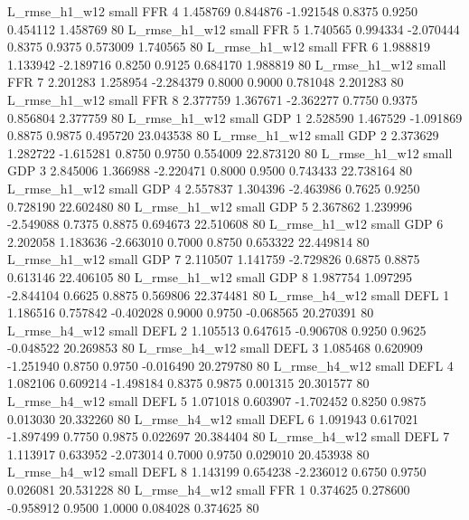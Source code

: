 L_rmse_h1_w12      small      FFR                 4 1.458769 0.844876 -1.921548 0.8375 0.9250  0.454112    1.458769 80
L_rmse_h1_w12      small      FFR                 5 1.740565 0.994334 -2.070444 0.8375 0.9375  0.573009    1.740565 80
L_rmse_h1_w12      small      FFR                 6 1.988819 1.133942 -2.189716 0.8250 0.9125  0.684170    1.988819 80
L_rmse_h1_w12      small      FFR                 7 2.201283 1.258954 -2.284379 0.8000 0.9000  0.781048    2.201283 80
L_rmse_h1_w12      small      FFR                 8 2.377759 1.367671 -2.362277 0.7750 0.9375  0.856804    2.377759 80
L_rmse_h1_w12      small      GDP                 1 2.528590 1.467529 -1.091869 0.8875 0.9875  0.495720   23.043538 80
L_rmse_h1_w12      small      GDP                 2 2.373629 1.282722 -1.615281 0.8750 0.9750  0.554009   22.873120 80
L_rmse_h1_w12      small      GDP                 3 2.845006 1.366988 -2.220471 0.8000 0.9500  0.743433   22.738164 80
L_rmse_h1_w12      small      GDP                 4 2.557837 1.304396 -2.463986 0.7625 0.9250  0.728190   22.602480 80
L_rmse_h1_w12      small      GDP                 5 2.367862 1.239996 -2.549088 0.7375 0.8875  0.694673   22.510608 80
L_rmse_h1_w12      small      GDP                 6 2.202058 1.183636 -2.663010 0.7000 0.8750  0.653322   22.449814 80
L_rmse_h1_w12      small      GDP                 7 2.110507 1.141759 -2.729826 0.6875 0.8875  0.613146   22.406105 80
L_rmse_h1_w12      small      GDP                 8 1.987754 1.097295 -2.844104 0.6625 0.8875  0.569806   22.374481 80
L_rmse_h4_w12      small     DEFL                 1 1.186516 0.757842 -0.402028 0.9000 0.9750 -0.068565   20.270391 80
L_rmse_h4_w12      small     DEFL                 2 1.105513 0.647615 -0.906708 0.9250 0.9625 -0.048522   20.269853 80
L_rmse_h4_w12      small     DEFL                 3 1.085468 0.620909 -1.251940 0.8750 0.9750 -0.016490   20.279780 80
L_rmse_h4_w12      small     DEFL                 4 1.082106 0.609214 -1.498184 0.8375 0.9875  0.001315   20.301577 80
L_rmse_h4_w12      small     DEFL                 5 1.071018 0.603907 -1.702452 0.8250 0.9875  0.013030   20.332260 80
L_rmse_h4_w12      small     DEFL                 6 1.091943 0.617021 -1.897499 0.7750 0.9875  0.022697   20.384404 80
L_rmse_h4_w12      small     DEFL                 7 1.113917 0.633952 -2.073014 0.7000 0.9750  0.029010   20.453938 80
L_rmse_h4_w12      small     DEFL                 8 1.143199 0.654238 -2.236012 0.6750 0.9750  0.026081   20.531228 80
L_rmse_h4_w12      small      FFR                 1 0.374625 0.278600 -0.958912 0.9500 1.0000  0.084028    0.374625 80
